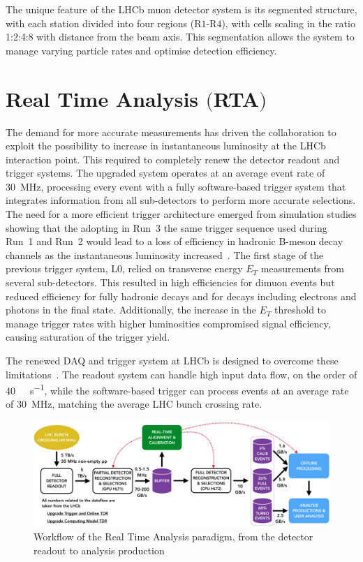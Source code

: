 The unique feature of the LHCb muon detector system is its segmented structure, with each station divided into four regions (R$1$-R$4$), with cells scaling in the ratio 1:2:4:8 with distance from the beam axis. This segmentation allows the system to manage varying particle rates and optimise detection efficiency. 


\section[Real Time Analysis]{Real Time Analysis $\bigl($RTA$\bigr)$}\label{sec:rta}

The demand for more accurate measurements has driven the collaboration to exploit the possibility to increase in instantaneous luminosity at the LHCb interaction point. This required to completely renew the detector readout and trigger systems. The upgraded system operates at an average event rate of \SI{30}{\mega\hertz}, processing every event with a fully software-based trigger system that integrates information from all sub-detectors to perform more accurate selections. The need for a more efficient trigger architecture emerged from simulation studies showing that the adopting in Run~3 the same trigger sequence used during Run~1 and Run~2 would lead to a loss of efficiency in hadronic B-meson decay channels as the instantaneous luminosity increased~\cite{CERN-LHCC-2011-001}. The first stage of the previous trigger system, L$0$, relied on transverse energy $E_T$ measurements from several sub-detectors. This resulted in high efficiencies for dimuon events but reduced efficiency for fully hadronic decays and for decays including electrons and photons in the final state. Additionally, the increase in the $E_T$ threshold to manage trigger rates with higher luminosities compromised signal efficiency, causing saturation of the trigger yield.

The renewed DAQ and trigger system at LHCb is designed to overcome these limitations~\cite{CERN-LHCC-2018-014}. The readout system can handle high input data flow, on the order of \SI[per-mode=symbol]{40}{\tera\bit\per\second}, while the software-based trigger can process events at an average rate of \SI{30}{\mega\hertz}, matching the average LHC bunch crossing rate.

\begin{figure}
    \centering
    \includegraphics[width=\textwidth]{figures/hidef_RTA_dataflow_widescreen.png}
    \caption{Workflow of the Real Time Analysis paradigm, from the detector readout to analysis production}
    \label{fig:RTA}
\end{figure}

